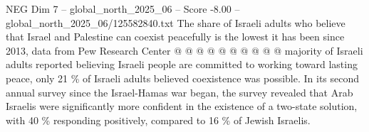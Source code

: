 \begin{textsample}{NEG Dim 7 – global\_north\_2025\_06 – Score -8.00 – global\_north\_2025\_06/125582840.txt}
The share of Israeli adults who believe that Israel and Palestine can coexist peacefully is the lowest it has been since 2013, data from Pew Research Center @ @ @ @ @ @ @ @ @ @ majority of Israeli adults reported believing Israeli people are committed to working toward lasting peace, only 21 \% of Israeli adults believed coexistence was possible.
In its second annual survey since the Israel-Hamas war began, the survey revealed that Arab Israelis were significantly more confident in the existence of a two-state solution, with 40 \% responding positively, compared to 16 \% of Jewish Israelis.

\end{textsample}
